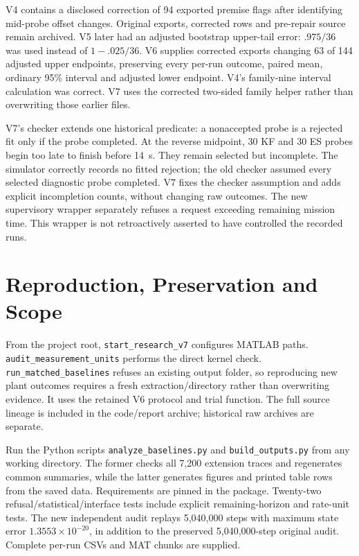 \documentclass[10pt,journal]{IEEEtran}
\begin{document}
V4 contains a disclosed correction of 94 exported premise flags after identifying mid-probe offset changes. Original exports, corrected rows and pre-repair source remain archived. V5 later had an adjusted bootstrap upper-tail error: $.975/36$ was used instead of $1-.025/36$. V6 supplies corrected exports changing 63 of 144 adjusted upper endpoints, preserving every per-run outcome, paired mean, ordinary 95\% interval and adjusted lower endpoint. V4's family-nine interval calculation was correct. V7 uses the corrected two-sided family helper rather than overwriting those earlier files.

V7's checker extends one historical predicate: a nonaccepted probe is a rejected fit only if the probe completed. At the reverse midpoint, 30 KF and 30 ES probes begin too late to finish before 14~s. They remain selected but incomplete. The simulator correctly records no fitted rejection; the old checker assumed every selected diagnostic probe completed. V7 fixes the checker assumption and adds explicit incompletion counts, without changing raw outcomes. The new supervisory wrapper separately refuses a request exceeding remaining mission time. This wrapper is not retroactively asserted to have controlled the recorded runs.

\section{Reproduction, Preservation and Scope}
From the project root, \texttt{start\_research\_v7} configures MATLAB paths. \texttt{audit\_measurement\_units} performs the direct kernel check. \texttt{run\_matched\_baselines} refuses an existing output folder, so reproducing new plant outcomes requires a fresh extraction/directory rather than overwriting evidence. It uses the retained V6 protocol and trial function. The full source lineage is included in the code/report archive; historical raw archives are separate.

Run the Python scripts \texttt{analyze\_baselines.py} and \texttt{build\_outputs.py} from any working directory. The former checks all 7,200 extension traces and regenerates common summaries, while the latter generates figures and printed table rows from the saved data. Requirements are pinned in the package. Twenty-two refusal/statistical/interface tests include explicit remaining-horizon and rate-unit tests. The new independent audit replays 5,040,000 steps with maximum state error $1.3553\times10^{-20}$, in addition to the preserved 5,040,000-step original audit. Complete per-run CSVs and MAT chunks are supplied.
\end{document}
